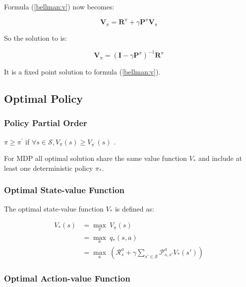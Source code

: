 Formula (\ref{bellman:v}) now becomes:

\begin{equation}
	\mathbf{V}_{\pi}=\mathbf{R}^{\pi} + \gamma \mathbf{P}^{\pi} \mathbf{V}_{\pi} 
\end{equation}

So the solution to  is:

\begin{equation}
	\mathbf{V}_{\pi}=(\mathbf{I} - \gamma \mathbf{P}^{\pi})^{-1}\mathbf{R}^{\pi}
\end{equation}

It is a fixed point solution to formula (\ref{bellman:v}).

\subsection{Optimal Policy}

\subsubsection{Policy Partial Order}

$\pi \geq \pi^{\prime}$ if $\forall s \in \mathcal{S}, V_{\pi} (s) \geq V_{\pi^{\prime}} (s)$ . 


For MDP all optimal solution share the same value function $V_*$ and include at least one deterministic policy $\pi_*$. 


\subsubsection{Optimal State-value Function}

The optimal state-value function $V_*$ is defined as:


\begin{equation}
	\begin{aligned}
		V_*(s) &= \underset{\pi}{\max} \ V_{\pi}(s) \\
		&= \underset{a}{\max}\ q_* (s, a) \\
		&= \underset{a}{\max}\ \left( \mathcal{R}_s^a + \gamma \sum_{s' \in \mathcal{S}} \mathcal{P}_{s,s'}^a V_*(s') \right )
	\end{aligned}
\end{equation}

\subsubsection{Optimal Action-value Function}


